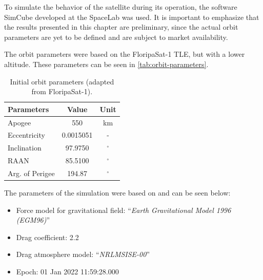 To simulate the behavior of the satellite during its operation, the software SimCube developed at the SpaceLab was used. It is important to emphasize that the results presented in this chapter are preliminary, since the actual orbit parameters are yet to be defined and are subject to market availability.

The orbit parameters were based on the FloripaSat-1 TLE, but with a lower altitude. These parameters can be seen in \autoref{tab:orbit-parameters}.

\begin{table}[!h]
    \centering
    \begin{tabular}{lcc}
        \toprule[1.5pt]
        \textbf{Parameters} & \textbf{Value} & \textbf{Unit} \\
        \midrule
        Apogee                & 550           & km \\
        Eccentricity            & 0.0015051     & - \\
        Inclination             & 97.9750       & $^{\circ}$ \\
        RAAN                    & 85.5100       & $^{\circ}$ \\
        Arg. of Perigee         & 194.87        & $^{\circ}$ \\
        \bottomrule[1.5pt]
    \end{tabular}
    \caption{Initial orbit parameters (adapted from FloripaSat-1).}
    \label{tab:orbit-parameters}
\end{table}

The parameters of the simulation were based on \cite{en13246691} and can be seen below:

\begin{itemize}
    \item Force model for gravitational field: ``\textit{Earth Gravitational Model 1996 (EGM96)}''
    \item Drag coefficient: 2.2
    \item Drag atmosphere model: ``\textit{NRLMSISE-00}''
    \item Epoch: 01 Jan 2022 11:59:28.000
\end{itemize}

